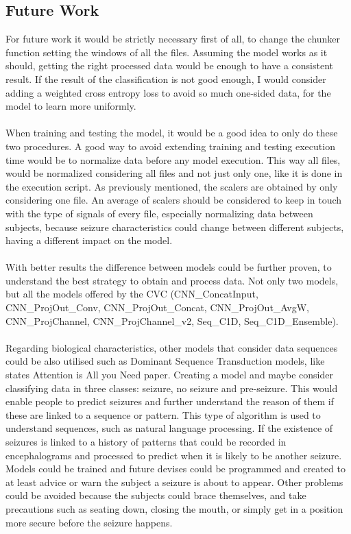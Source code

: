 \subsection{Future Work}
For future work it would be strictly necessary first of all, to change the chunker function setting the windows of all the files. Assuming the model works as it should, getting the right processed data would be enough to have a consistent result. If the result of the classification is not good enough, I would consider adding a weighted cross entropy loss to avoid so much one-sided data, for the model to learn more uniformly.
\\\\
When training and testing the model, it would be a good idea to only do these two procedures. A good way to avoid extending training and testing execution time would be to normalize data before any model execution. This way all files, would be normalized considering all files and not just only one, like it is done in the execution script. As previously mentioned, the scalers are obtained by only considering one file. An average of scalers should be considered to keep in touch with the type of signals of every file, especially normalizing data between subjects, because seizure characteristics could change between different subjects, having a different impact on the model.
\\\\
With better results the difference between models could be further proven, to understand the best strategy to obtain and process data. Not only two models, but all the models offered by the CVC (CNN\_ConcatInput, CNN\_ProjOut\_Conv, CNN\_ProjOut\_Concat, CNN\_ProjOut\_AvgW, CNN\_ProjChannel, CNN\_ProjChannel\_v2, Seq\_C1D, Seq\_C1D\_Ensemble).
\\\\
Regarding biological characteristics, other models that consider data sequences could be also utilised such as Dominant Sequence Transduction models, like states Attention is All you Need paper. Creating a model and maybe consider classifying data in three classes: seizure, no seizure and pre-seizure. This would enable people to predict seizures and further understand the reason of them if these are linked to a sequence or pattern. This type of algorithm is used to understand sequences, such as natural language processing. If the existence of seizures is linked to a history of patterns that could be recorded in encephalograms and processed to predict when it is likely to be another seizure. Models could be trained and future devises could be programmed and created to at least advice or warn the subject a seizure is about to appear. Other problems could be avoided because the subjects could brace themselves, and take precautions such as seating down, closing the mouth, or simply get in a position more secure before the seizure happens.
